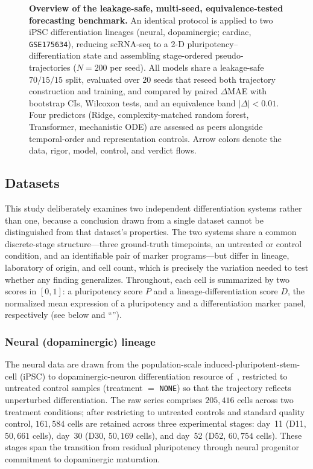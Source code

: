 \documentclass[10pt,letterpaper]{article}
\begin{document}
\begin{figure}[!h]
\caption{\textbf{Overview of the leakage-safe, multi-seed, equivalence-tested forecasting benchmark.}
An identical protocol is applied to two iPSC differentiation lineages (neural, dopaminergic; cardiac, \texttt{GSE175634}), reducing scRNA-seq to a 2-D pluripotency--differentiation state and assembling stage-ordered pseudo-trajectories ($N=200$ per seed). All models share a leakage-safe $70/15/15$ split, evaluated over $20$ seeds that reseed both trajectory construction and training, and compared by paired $\Delta$MAE with bootstrap CIs, Wilcoxon tests, and an equivalence band $|\Delta|<0.01$. Four predictors (Ridge, complexity-matched random forest, Transformer, mechanistic ODE) are assessed as peers alongside temporal-order and representation controls. Arrow colors denote the data, rigor, model, control, and verdict flows.}
\label{fig:system}
\end{figure}

\subsection*{Datasets}
\label{subsec:data_state}

This study deliberately examines two independent differentiation systems rather than one, because a conclusion drawn from a single dataset cannot be distinguished from that dataset's properties. The two systems share a common discrete-stage structure---three ground-truth timepoints, an untreated or control condition, and an identifiable pair of marker programs---but differ in lineage, laboratory of origin, and cell count, which is precisely the variation needed to test whether any finding generalizes. Throughout, each cell is summarized by two scores in $[0,1]$: a pluripotency score $P$ and a lineage-differentiation score $D$, the normalized mean expression of a pluripotency and a differentiation marker panel, respectively (see below and ``'').

\subsubsection*{Neural (dopaminergic) lineage}
The neural data are drawn from the population-scale induced-pluripotent-stem-cell (iPSC) to dopaminergic-neuron differentiation resource of~\cite{jerber2021population}, restricted to untreated control samples (treatment $=$ \texttt{NONE}) so that the trajectory reflects unperturbed differentiation. The raw series comprises $205{,}416$ cells across two treatment conditions; after restricting to untreated controls and standard quality control, $161{,}584$ cells are retained across three experimental stages: day~11 (D11, $50{,}661$ cells), day~30 (D30, $50{,}169$ cells), and day~52 (D52, $60{,}754$ cells). These stages span the transition from residual pluripotency through neural progenitor commitment to dopaminergic maturation.
\end{document}
